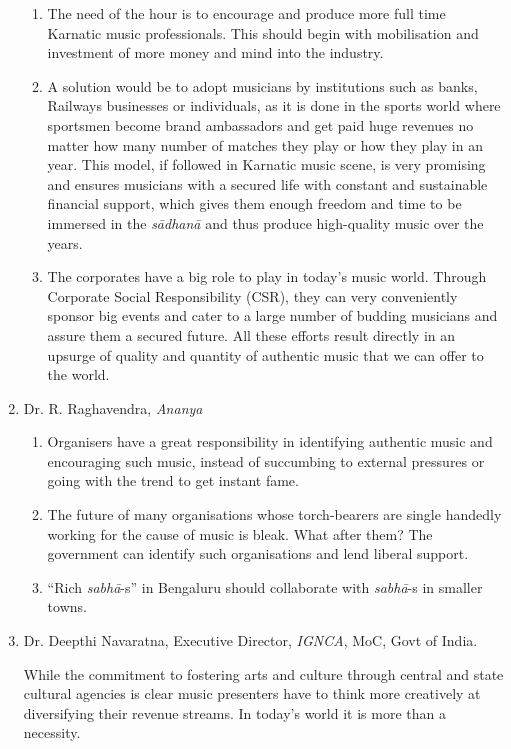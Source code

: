 \begin{enumerate}
\begin{enumerate}
 \item The need of the hour is to encourage and produce more full time Karnatic music professionals. This should begin with mobilisation and investment of more money and mind into the industry.

 \item A solution would be to adopt musicians by institutions such as banks, Railways businesses or individuals, as it is done in the sports world where sportsmen become brand ambassadors and get paid huge revenues no matter how many number of matches they play or how they play in an year. This model, if followed in Karnatic music scene, is very promising and ensures musicians with a secured life with constant and sustainable financial support, which gives them enough freedom and time to be immersed in the \textit{sādhanā} and thus produce high-quality music over the years.

 \item The corporates have a big role to play in today’s music world. Through Corporate Social Responsibility (CSR), they can very conveniently sponsor big events and cater to a large number of budding musicians and assure them a secured future. All these efforts result directly in an upsurge of quality and quantity of authentic music that we can offer to the world.
\end{enumerate}


 \newpage

 \item Dr. R. Raghavendra, \textit{Ananya}
 
\begin{enumerate}
\itemsep=0pt

 \item Organisers have a great responsibility in identifying authentic music and encouraging such music, instead of succumbing to external pressures or going with the trend to get instant fame.

 \item The future of many organisations whose torch-bearers are single handedly working for the cause of music is bleak. What after them? The government can identify such organisations and lend liberal support.

 \item “Rich \textit{sabhā}-s” in Bengaluru should collaborate with \textit{sabhā}-s in smaller towns.
\end{enumerate}


 \item 
 Dr. Deepthi Navaratna, Executive Director, \textit{IGNCA}, MoC, Govt of India.

 While the commitment to fostering arts and culture through central and state cultural agencies is clear music presenters have to think more creatively at diversifying their revenue streams. In today’s world it is more than a necessity.

\end{enumerate}

